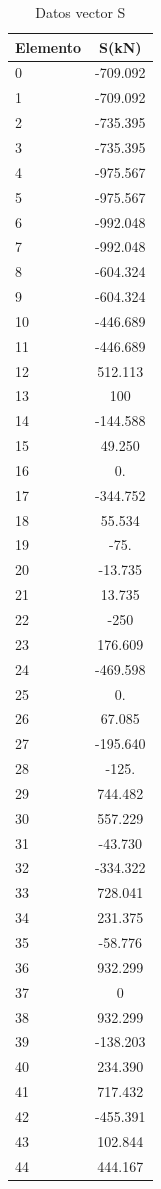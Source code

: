 \documentclass[]{article}
\begin{document}
	\begin{table}[htbp]
		\centering
		\caption{Datos vector S}
		\label{tab: Vector_S_P1_b2}
		\begin{tabular}{lc}
			\toprule
			\textbf{Elemento} & S\textbf{(kN)} \\
			\midrule
			0 & -709.092\\
			1 & -709.092\\
			2 & -735.395\\
			3 & -735.395\\
			4 & -975.567\\
			5 & -975.567\\
			6 & -992.048\\
			7 & -992.048\\
			8 & -604.324\\
			9 & -604.324\\
			10 & -446.689\\
			11 & -446.689\\
			12 & 512.113  \\
			13 & 100         \\
			14 & -144.588\\
			15 & 49.250 \\
			16 & 0.          \\
			17 & -344.752\\
			18 & 55.534 \\
			19 & -75.        \\
			20 & -13.735\\
			21 & 13.735 \\
			22 & -250        \\
			23 & 176.609\\
			24 & -469.598\\
			25 & 0.          \\
			26 & 67.085 \\
			27 & -195.640\\
			28 & -125.       \\
			29 & 744.482\\
			30 & 557.229\\
			31 & -43.730\\
			32 & -334.322\\
			33 & 728.041\\
			34 & 231.375\\
			35 & -58.776\\
			36 & 932.299\\
			37 & 0      \\
			38 & 932.299\\
			39 & -138.203\\
			40 & 234.390\\
			41 & 717.432\\
			42 & -455.391\\
			43 & 102.844 \\
			44 & 444.167\\
			\bottomrule
		\end{tabular}
	\end{table}
	
\end{document}
